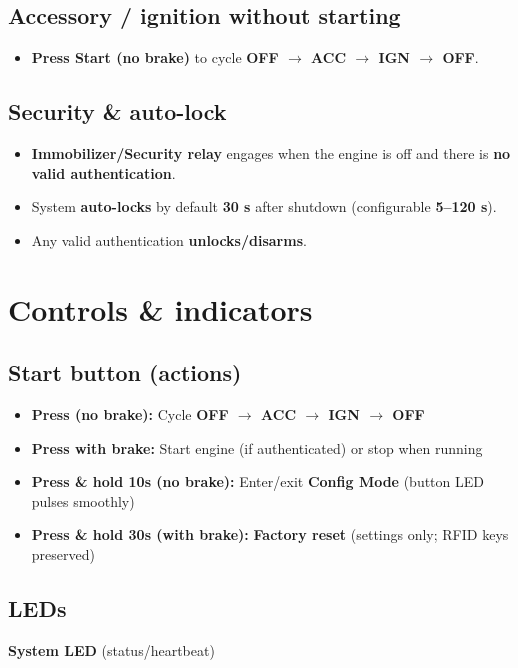 \documentclass[11pt]{article}
\newcommand{\gkto}{\texorpdfstring{$\rightarrow$}{->}}
\begin{document}
\subsection{Accessory / ignition without starting}
\begin{itemize}
  \item \textbf{Press Start (no brake)} to cycle \textbf{OFF \gkto{} ACC \gkto{} IGN \gkto{} OFF}.
\end{itemize}

\subsection{Security \& auto-lock}
\begin{itemize}
  \item \textbf{Immobilizer/Security relay} engages when the engine is off and there is \textbf{no valid authentication}.
  \item System \textbf{auto-locks} by default \textbf{30 s} after shutdown (configurable \textbf{5--120 s}).
  \item Any valid authentication \textbf{unlocks/disarms}.
\end{itemize}

\section{Controls \& indicators}
\subsection{Start button (actions)}
\begin{itemize}
  \item \textbf{Press (no brake):} Cycle \textbf{OFF \gkto{} ACC \gkto{} IGN \gkto{} OFF}
  \item \textbf{Press with brake:} Start engine (if authenticated) or stop when running
  \item \textbf{Press \& hold 10s (no brake):} Enter/exit \textbf{Config Mode} (button LED pulses smoothly)
  \item \textbf{Press \& hold 30s (with brake):} \textbf{Factory reset} (settings only; RFID keys preserved)
\end{itemize}

\subsection{LEDs}
\textbf{System LED} (status/heartbeat)
\end{document}
